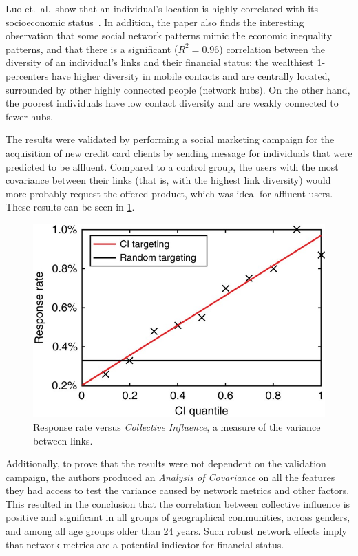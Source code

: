 Luo et.\ al.\ show that an individual's location is highly correlated with its socioeconomic status~\cite{Luo2017inferring}.
In addition, the paper also finds the interesting observation that some social network patterns mimic the economic inequality patterns, and that there is a significant ($R^2 = 0.96$) correlation between the diversity of an individual's links and their financial status: the wealthiest 1-percenters have higher diversity in mobile contacts and are centrally located, surrounded by other highly connected people (network hubs). On the other hand, the poorest individuals have low contact diversity and are weakly connected to fewer hubs.

The results were validated by performing a social marketing campaign for the acquisition of new credit card clients by sending message for individuals that were predicted to be affluent.
Compared to a control group, the users with the most covariance between their links (that is, with the highest link diversity) would more probably request the offered product, which was ideal for affluent users. These results can be seen in \cref{fig:luo2017results}.

\begin{figure}
\centering
\includegraphics[height=.25\textheight]{figures/luo2017results.png}
\caption{Response rate versus \emph{Collective Influence}, a measure of the variance between links.}
\label{fig:luo2017results}
\end{figure}

Additionally, to prove that the results were not dependent on the validation campaign, the authors produced an \emph{Analysis of Covariance}\cite{wildt1978analysis} on all the features they had access to test the variance caused by network metrics and other factors.
This resulted in the conclusion that the correlation between collective influence is positive and significant in all groups of geographical communities, across genders, and among all age groups older than 24 years.
Such robust network effects imply that network metrics are a potential indicator for financial status.

